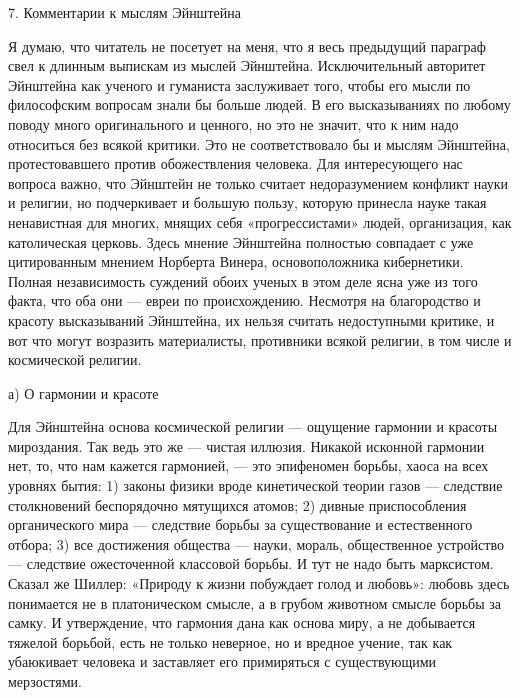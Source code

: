 7. Комментарии к мыслям Эйнштейна

Я думаю, что читатель не посетует на меня, что я весь предыдущий параграф свел
к длинным выпискам из мыслей Эйнштейна. Исключительный авторитет Эйнштейна как
ученого и гуманиста заслуживает того, чтобы его мысли по философским вопросам
знали бы больше людей. В его высказываниях по любому поводу много оригинального
и ценного, но это не значит, что к ним надо относиться без всякой критики. Это
не соответствовало бы и мыслям Эйнштейна, протестовавшего против обожествления
человека. Для интересующего нас вопроса важно, что Эйнштейн не только считает
недоразумением конфликт науки и религии, но подчеркивает и большую пользу,
которую принесла науке такая ненавистная для многих, мнящих себя
«прогрессистами» людей, организация, как католическая церковь. Здесь мнение
Эйнштейна полностью совпадает с уже цитированным мнением Норберта Винера,
основоположника кибернетики. Полная независимость суждений обоих ученых в этом
деле ясна уже из того факта, что оба они --- евреи по происхождению. Несмотря на
благородство и красоту высказываний Эйнштейна, их нельзя считать недоступными
критике, и вот что могут возразить материалисты, противники всякой религии, в
том числе и космической религии.

а) О гармонии и красоте

Для Эйнштейна основа космической религии --- ощущение гармонии и красоты
мироздания. Так ведь это же --- чистая иллюзия. Никакой исконной гармонии нет,
то, что нам кажется гармонией, --- это эпифеномен борьбы, хаоса на всех уровнях
бытия: 1) законы физики вроде кинетической теории газов --- следствие
столкновений беспорядочно мятущихся атомов; 2) дивные приспособления
органического мира --- следствие борьбы за существование и естественного отбора;
3) все достижения общества --- науки, мораль, общественное устройство --- следствие
ожесточенной классовой борьбы. И тут не надо быть марксистом. Сказал же Шиллер:
«Природу к жизни побуждает голод
и любовь»: любовь здесь понимается не в платоническом смысле, а в грубом
животном смысле борьбы за самку. И утверждение, что гармония дана как основа
миру, а не добывается тяжелой борьбой, есть не только неверное, но и вредное
учение, так как убаюкивает человека и заставляет его примиряться с
существующими мерзостями.


